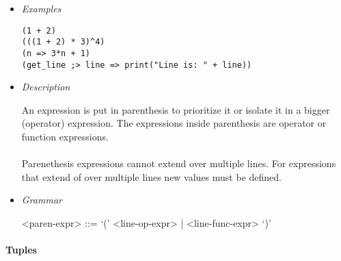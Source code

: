 \documentclass{article}
\begin{document}
\begin{itemize}

\item \textit{Examples}
\begin{verbatim}
(1 + 2)
(((1 + 2) * 3)^4)
(n => 3*n + 1)
(get_line ;> line => print("Line is: " + line))
\end{verbatim}

\item \textit{Description}

An expression is put in parenthesis to prioritize it or isolate it in a bigger
(operator) expression. The expressions inside parenthesis are operator
or function expressions.
\\\\
Parenethesis expressions cannot extend over multiple lines. For expressions
that extend of over multiple lines new values must be defined.

\item \textit{Grammar}
\begin{grammar}
<paren-expr> ::= `(' <line-op-expr> | <line-func-expr> `)'  
\end{grammar}

\end{itemize}

\paragraph{Tuples}
\end{document}
